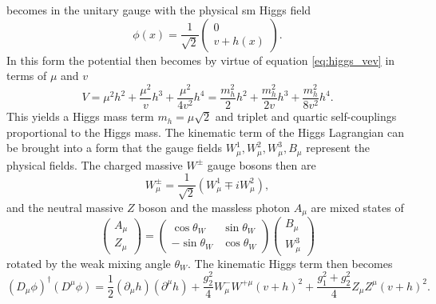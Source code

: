 becomes in the unitary gauge with the physical \ac{sm} Higgs field
\begin{equation}
    \phi(x)=\frac{1}{\sqrt{2}}
    \begin{pmatrix}
        0 \\
        v+h(x)
    \end{pmatrix}.
    \label{eq:unitary_gauge}
\end{equation}
In this form the potential then becomes by virtue of equation \ref{eq:higgs_vev} in terms of $\mu$ and $v$
\begin{equation}
    V=\mu^2h^2+\frac{\mu^2}{v}h^3+\frac{\mu^2}{4v^2}h^4
    =
    \frac{m_h^2}{2}h^2+\frac{m_h^2}{2v}h^3+\frac{m_h^2}{8v^2}h^4.
    \label{eq:higgs_potential}
\end{equation}
This yields a Higgs mass term $m_h=\mu\sqrt{2}$ and triplet and quartic self-couplings proportional to the Higgs mass. The kinematic term of the Higgs Lagrangian can be brought into a form that the gauge fields $W^1_\mu,W^2_\mu,W^3_\mu,B_\mu$ represent the physical fields. The charged massive $W^{\pm}$ gauge bosons then are
\begin{equation}
    W_\mu^\pm = \frac{1}{\sqrt{2}}(W_\mu^1\mp i W_\mu^2),
\end{equation}
and the neutral massive $Z$ boson and the massless photon $A_\mu$ are mixed states of
\begin{equation}
    \begin{pmatrix}
        A_\mu \\
        Z_\mu
    \end{pmatrix}
    =
    \begin{pmatrix}
        \cos\theta_W  & \sin\theta_W \\
        -\sin\theta_W & \cos\theta_W
    \end{pmatrix}
    \begin{pmatrix}
        B_\mu \\
        W^3_\mu
    \end{pmatrix}
\end{equation}
rotated by the weak mixing angle $\theta_W$. The kinematic Higgs term then becomes
\begin{equation}
    \left(D_\mu\phi\right)^\dagger (D^\mu\phi )=
    \frac{1}{2}(\partial_\mu h)(\partial^\mu h)+
    \frac{g_2^2}{4}W^-_\mu W^{+\mu}(v+h)^2+
    \frac{g_1^2+g_2^2}{4} Z_\mu Z^\mu(v+h)^2.
    \label{eq:higgs_kinematic}
\end{equation}
